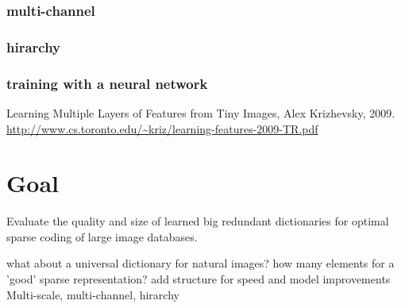 \subsubsection{multi-channel}
\subsubsection{hirarchy}
\subsubsection{training with a neural network}
Learning Multiple Layers of Features from Tiny Images, Alex Krizhevsky, 2009.\\
\url{http://www.cs.toronto.edu/~kriz/learning-features-2009-TR.pdf}

\section{Goal}
Evaluate the quality and size of learned big redundant dictionaries for 
optimal sparse coding of large image databases.

what about a universal dictionary for natural images? 
how many elements for a 'good' sparse representation?
add structure for speed and model improvements
Multi-scale, multi-channel, hirarchy
